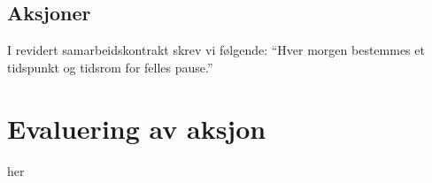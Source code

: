 \subsection*{Aksjoner}
I revidert samarbeidskontrakt skrev vi følgende: ``Hver morgen bestemmes et tidspunkt og tidsrom for felles pause.''

\section{Evaluering av aksjon} 

her
